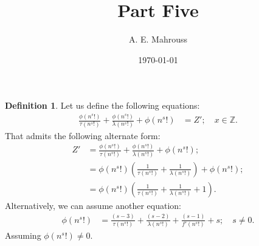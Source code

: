 \documentclass[10pt]{article}
\title{%
  \vspace{-1.5em}%
  \large\textbf{Part Five}%
}
\author{A. E. Mahrouss}
\date{\today}
\theoremstyle{plain}
\theoremstyle{definition}
\newtheorem{definition}[theorem]{Definition}
\theoremstyle{remark}
\begin{document}
\begin{definition}
	Let us define the following equations:
	\begin{align*}
		\frac{\phi(n^{s}!)}{\tau(n^{s}!)} + \frac{\phi(n^{s}!)}{\lambda(n^{s}!)} + \phi(n^{s}!) &= Z'; \quad x \in \mathbb{Z}.
	\end{align*}
	That admits the following alternate form:
	\begin{align*}
		Z' &= \frac{\phi(n^{s}!)}{\tau(n^{s}!)} + \frac{\phi(n^{s}!)}{\lambda(n^{s}!)} + \phi(n^{s}!);\\
		&= \phi(n^{s}!)(\frac{1}{\tau(n^{s}!)} + \frac{1}{\lambda(n^{s}!)}) + \phi(n^{s}!);\\
		&= \phi(n^{s}!)(\frac{1}{\tau(n^{s}!)} + \frac{1}{\lambda(n^{s}!)} + 1).
	\end{align*}
	Alternatively, we can assume another equation:
	\begin{align*}
		\phi(n^{s}!) &= \frac{(s-3)}{\tau(n^{s}!)} + \frac{(s-2)}{\lambda(n^{s}!)} + \frac{(s-1)}{f'(n^{s}!)} + s; \quad s \neq 0.
	\end{align*}
	Assuming $\phi(n^{s}!) \neq 0.$
\end{definition}

\nocite{*}


\end{document}
